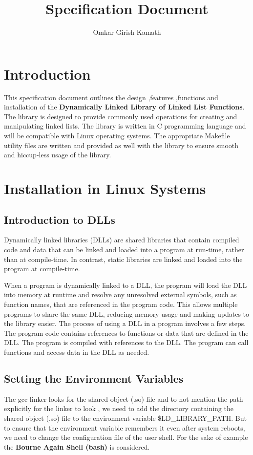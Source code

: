 \documentclass{article}
\title{Specification Document}
\author{Omkar Girish Kamath}
\begin{document}
  \maketitle \tableofcontents \date
  \vspace*{8cm}
  \section{\textbf{Introduction}}
  This specification document outlines the design ,features ,functions
  and installation of the \textbf{Dynamically Linked Library of Linked
    List Functions}. The library is designed to provide commonly used
  operations for creating and manipulating linked lists. The library
  is written in C programming language and will be compatible with
  Linux operating systems. The appropriate Makefile utility files are
  written and provided as well with the library to ensure smooth and
  hiccup-less usage of the library.
  \section{\textbf{Installation in Linux Systems}}
  \subsection{Introduction to DLLs}
  Dynamically linked libraries (DLLs) are shared libraries that
  contain compiled code and data that can be linked and loaded into a
  program at run-time, rather than at compile-time. In contrast,
  static libraries are linked and loaded into the program at
  compile-time.

When a program is dynamically linked to a DLL, the program will load
the DLL into memory at runtime and resolve any unresolved external
symbols, such as function names, that are referenced in the program
code. This allows multiple programs to share the same DLL, reducing
memory usage and making updates to the library easier.  The process of
using a DLL in a program involves a few steps.  The program code
contains references to functions or data that are defined in the DLL.
The program is compiled with references to the DLL.  The program can
call functions and access data in the DLL as needed.
\subsection{Setting the Environment Variables}
The gcc linker looks for the shared object (.so) file and to not
mention the path explicitly for the linker to look , we need to add
the directory containing the shared object (.so) file to the
environment variable \$LD\_LIBRARY\_PATH. But to ensure that the
environment variable remembers it even after system reboots, we need
to change the configuration file of the user shell. For the sake of
example the \textbf{Bourne Again Shell (bash)} is considered.
\end{document}
